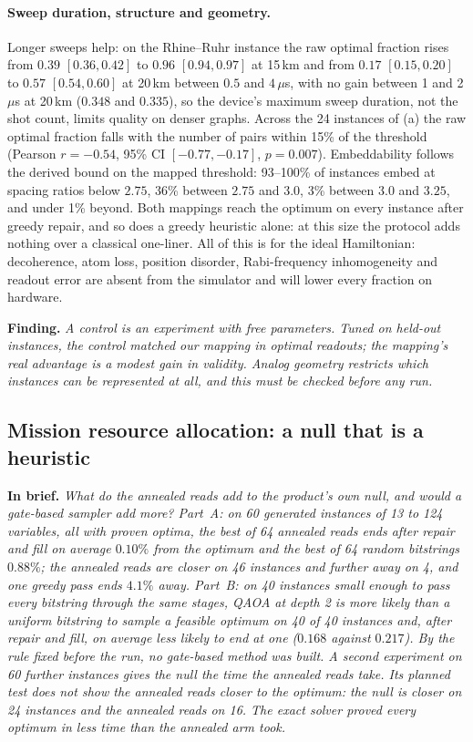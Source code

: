 \documentclass[11pt,a4paper]{article}
\newcommand{\finding}[1]{\par\smallskip\noindent\textbf{Finding.} \emph{#1}\par\smallskip}
\newcommand{\inbrief}[1]{\par\smallskip\noindent\textbf{In brief.} \emph{#1}\par\medskip}
\begin{document}
\paragraph{Sweep duration, structure and geometry.} Longer sweeps help: on
the Rhine--Ruhr instance the raw optimal fraction rises from $0.39$
$[0.36, 0.42]$ to $0.96$ $[0.94, 0.97]$ at 15\,km and from $0.17$
$[0.15, 0.20]$ to $0.57$ $[0.54, 0.60]$ at 20\,km between $0.5$ and
$4\,\mu$s, with no gain between 1 and 2\,$\mu$s at 20\,km ($0.348$ and
$0.335$), so the device's maximum sweep duration, not the shot count, limits
quality on denser graphs. Across the 24 instances of (a) the raw optimal
fraction falls with the number of pairs within 15\% of the threshold
(Pearson $r = -0.54$, 95\% CI $[-0.77, -0.17]$, $p = 0.007$). Embeddability
follows the derived bound on the mapped threshold: 93--100\% of
instances embed at spacing ratios below $2.75$, 36\% between $2.75$ and
$3.0$, 3\% between $3.0$ and $3.25$, and under 1\% beyond. Both mappings reach the optimum on every
instance after greedy repair, and so does a greedy heuristic alone: at this
size the protocol adds nothing over a classical one-liner. All of this is
for the ideal Hamiltonian: decoherence, atom loss, position disorder,
Rabi-frequency inhomogeneity and readout error are absent from the simulator
and will lower every fraction on hardware.

\finding{A control is an experiment with free parameters. Tuned on held-out
instances, the control matched our mapping in optimal readouts; the mapping's
real advantage is a modest gain in validity. Analog geometry restricts which
instances can be represented at all, and this must be checked before any
run.}

\subsection{Mission resource allocation: a null that is a heuristic}
\label{sec:res-mission}

\inbrief{What do the annealed reads add to the product's own null, and would
a gate-based sampler add more? Part~A: on 60 generated instances of 13 to
124 variables, all with proven optima, the best of 64 annealed reads ends
after repair and fill on average $0.10\%$ from the optimum and the best of
64 random bitstrings $0.88\%$; the annealed reads are closer on 46 instances
and further away on 4, and one greedy pass ends $4.1\%$ away. Part~B: on 40
instances small enough to pass every bitstring through the same stages, QAOA
at depth 2 is more likely than a uniform bitstring to sample a feasible
optimum on 40 of 40 instances and, after repair and fill, on average less
likely to end at one ($0.168$ against $0.217$). By the rule fixed before the
run, no gate-based method was built. A second experiment on 60 further
instances gives the null the time the annealed reads take. Its planned test
does not show the annealed reads closer to the optimum: the null is closer
on 24 instances and the annealed reads on 16. The exact solver proved every
optimum in less time than the annealed arm took.}
\end{document}
